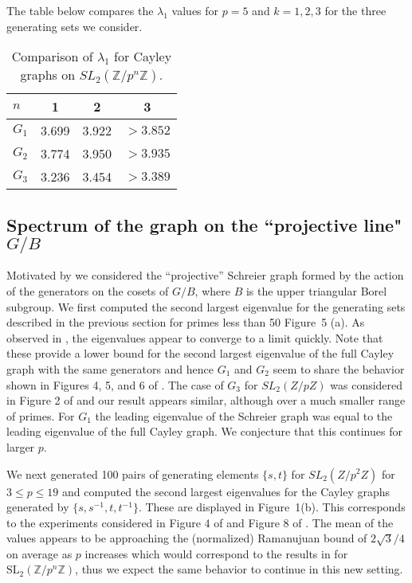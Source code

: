 \documentclass[12pt,reqno]{amsart}
\theoremstyle{remark}
\numberwithin{table}{section}
\newcommand{\Z}{\mathbb Z}
\newcommand{\slpn}{\text{SL}_2(\Z/p^n \Z)}
\begin{document}
The table below compares the $\lambda_1$ values for $p=5$ and $k=1,2,3$ for the three generating sets we consider. 

\begin{table}[!h]
\begin{tabular}{|l|c|c|c|}
\hline
$n$&1&2&3\\
\hline
\hline
$G_1$&3.699&3.922&$>3.852$\\
\hline
$G_2$&3.774&3.950&$>3.935$\\
\hline
$G_3$&3.236&3.454&$>3.389$\\
\hline
\end{tabular}
\caption{Comparison of $\lambda_1$ for Cayley graphs on $SL_2(\mathbb{Z}/p^n\mathbb{Z})$. }
\end{table}


\subsection{Spectrum of the graph on the ``projective line" $G/B$} Motivated by \cite{RS} we   considered the ``projective'' Schreier graph formed by the action of the generators on the cosets of $G/B$, where $B$ is the upper triangular Borel subgroup. 
We first computed the second largest eigenvalue for the generating sets described in the previous section for primes less than 50 Figure~5 (a). As observed in \cite{LR92}, the eigenvalues appear to converge to a limit quickly. Note that these provide a lower bound for the second largest eigenvalue of the full Cayley graph with the same generators and hence $G_1$ and $G_2$ seem to share the behavior shown in Figures 4, 5, and 6 of \cite{LR92}. The case of $G_3$  for $SL_2(Z/pZ)$ was considered in Figure 2 of \cite{RS}  and our result appears similar, although over a much smaller range of primes. For $G_1$ the leading eigenvalue of the Schreier graph was equal to the leading eigenvalue of the full Cayley graph. We conjecture that this continues for larger $p$. 

We next generated 100 pairs of generating elements $\{s,t\}$ for $SL_2(Z/p^2Z)$ for $3\leq p\leq 19$ and computed the second largest eigenvalues for the Cayley graphs generated by $\{s,s^{-1},t,t^{-1}\}$. These are displayed in Figure~1(b). This corresponds to the experiments considered in Figure 4 of \cite{RS} and Figure 8 of \cite{LR92}. The mean of the values appears to be approaching the (normalized) Ramanujuan bound of $2\sqrt{3}/4$ on average as $p$ increases which would correspond to the results in \cite{RS} for $\slpn$, thus we expect the same behavior to continue in this new setting. 
\end{document}
